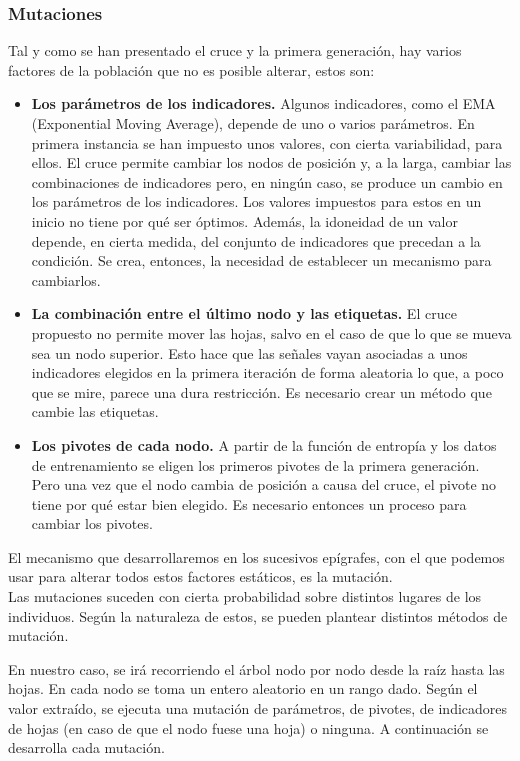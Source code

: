 \subsubsection{Mutaciones}
Tal y como se han presentado el cruce y la primera generaci\'on, hay varios factores de la poblaci\'on que no es posible alterar, estos son:

\begin{itemize}
    \item \textbf{Los par\'ametros de los indicadores.} Algunos indicadores, como el EMA (Exponential Moving Average), depende de uno o varios par\'ametros. En primera instancia se han impuesto unos valores, con cierta variabilidad, para ellos. El cruce permite cambiar los nodos de posici\'on y, a la larga, cambiar las combinaciones de indicadores pero, en ning\'un caso, se produce un cambio en los par\'ametros de los indicadores. Los valores impuestos para estos en un inicio no tiene por qu\'e ser \'optimos. Adem\'as, la idoneidad de un valor depende, en cierta medida, del conjunto de indicadores que precedan a la condici\'on. Se crea, entonces, la necesidad de establecer un mecanismo para cambiarlos.
    \item \textbf{La combinaci\'on entre el \'ultimo nodo y las etiquetas.} El cruce propuesto no permite mover las hojas, salvo en el caso de que lo que se mueva sea un nodo superior. Esto hace que las se\~nales vayan asociadas a unos indicadores elegidos en la primera iteraci\'on de forma aleatoria lo que, a poco que se mire, parece una dura restricci\'on. Es necesario crear un m\'etodo que cambie las etiquetas. 
    \item \textbf{Los pivotes de cada nodo.} A partir de la funci\'on de entrop\'ia y los datos de entrenamiento se eligen los primeros pivotes de la primera generaci\'on. Pero una vez que el nodo cambia de posici\'on a causa del cruce, el pivote no tiene por qu\'e estar bien elegido. Es necesario entonces un proceso para cambiar los pivotes.
\end{itemize}

 El mecanismo que desarrollaremos en los sucesivos ep\'igrafes, con el que podemos usar para alterar todos estos factores est\'aticos, es la mutaci\'on.\\
 
 Las mutaciones suceden con cierta probabilidad sobre distintos lugares de los individuos. Seg\'un la naturaleza de estos, se pueden plantear distintos m\'etodos de mutaci\'on. 
 
 En nuestro caso, se ir\'a recorriendo el \'arbol nodo por nodo desde la ra\'iz hasta las hojas. En cada nodo se toma un entero aleatorio en un rango dado. Seg\'un el valor extra\'ido, se ejecuta una mutaci\'on de par\'ametros, de pivotes, de indicadores de hojas (en caso de que el nodo fuese una hoja) o ninguna. A continuaci\'on se desarrolla cada mutaci\'on.

